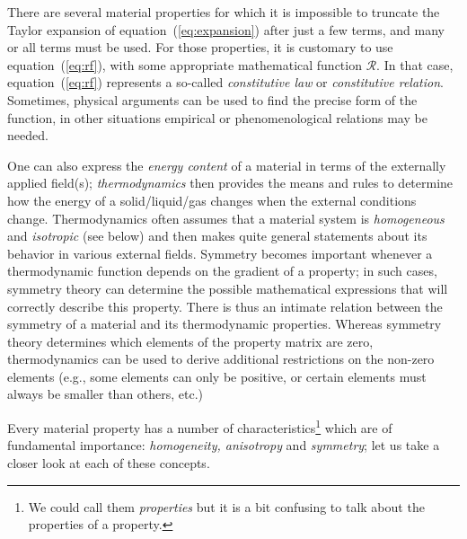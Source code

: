 There are several material properties for which it is impossible to truncate the Taylor expansion of equation~(\ref{eq:expansion}) after just a few terms, and many or all terms must be used. For those properties, it is customary to use equation~(\ref{eq:rf}), with some appropriate mathematical function $\mathcal{R}$. In that case, equation~(\ref{eq:rf}) represents a so-called \textit{constitutive law} or \textit{constitutive relation}.  Sometimes, physical arguments can be used to find the precise form of the function, in other situations empirical or phenomenological relations may be needed.

One can also express the \textit{energy content} of a material in terms of the externally applied field(s); \textit{thermodynamics} then provides the means and rules to determine how the energy of a solid/liquid/gas changes when the external conditions change.  Thermodynamics often assumes that a material system is \textit{homogeneous} and \textit{isotropic} (see below) and then makes quite general statements about its behavior in various external fields.  Symmetry becomes important whenever a thermodynamic function depends on the gradient of a property; in such cases, symmetry theory can determine the possible mathematical expressions that will correctly describe this property.  There is thus an intimate relation between the symmetry of a material and its thermodynamic properties.  Whereas symmetry theory determines which elements of the property matrix are zero, thermodynamics can be used to derive additional restrictions on the non-zero elements (e.g., some elements can only be positive, or certain elements must always be smaller than others, etc.)  

Every material property has a number of characteristics\footnote{We could call them \textit{properties} but it is a bit confusing to talk about the properties of a property.} which are of fundamental importance: \textit{homogeneity, anisotropy} and \textit{symmetry}; let us take a closer look at each of these concepts.

